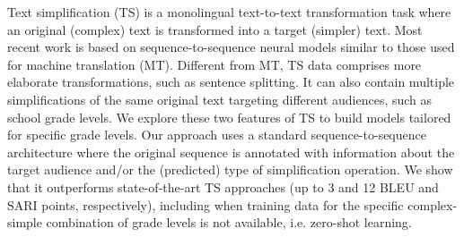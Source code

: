 Text simplification (TS) is a monolingual text-to-text transformation task where an original (complex) text is transformed into a target (simpler) text. Most recent work is based on sequence-to-sequence neural models similar to those used for machine translation (MT). Different from MT, TS data comprises more elaborate transformations, such as sentence splitting. It can also contain multiple simplifications of the same original text targeting different audiences, such as school grade levels. We explore these two features of TS to build models tailored for specific grade levels. Our approach uses a standard sequence-to-sequence architecture where the original sequence is annotated with information about the target audience and/or the (predicted) type of simplification operation. We show that it outperforms state-of-the-art TS approaches (up to 3 and 12 BLEU and SARI points, respectively), including  when training data for the specific complex-simple combination of grade levels is not available, i.e. zero-shot learning.
